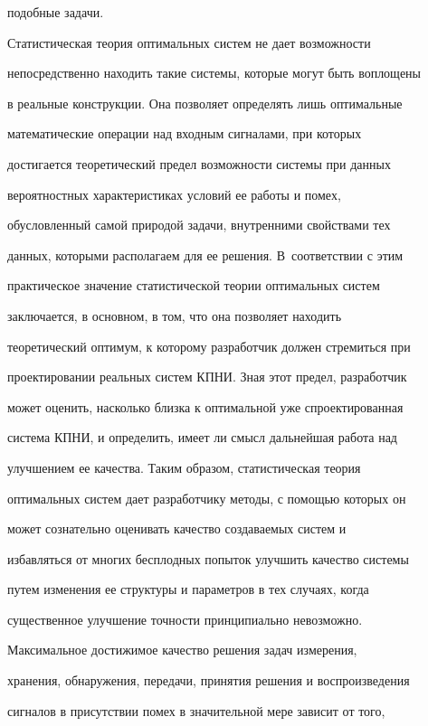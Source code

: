 подобные задачи.





Статистическая теория оптимальных систем не дает возможности


непосредственно находить такие системы, которые могут быть воплощены


в реальные  конструкции. Она позволяет определять лишь оптимальные


математические операции над входным сигналами, при которых


достигается теоретический предел возможности системы при данных


вероятностных характеристиках условий ее работы и помех,


обусловленный самой природой задачи, внутренними свойствами тех


данных, которыми располагаем для ее решения. В~соответствии с этим


практическое значение статистической теории оптимальных систем


заключается, в основном, в том, что она позволяет находить


теоретический оптимум, к которому разработчик должен стремиться при


проектировании  реальных систем \mbox{КПНИ}. Зная этот предел, разработчик


может оценить, насколько близка к оптимальной уже спроектированная


сис\-те\-ма \mbox{КПНИ}, и определить, имеет ли смысл дальнейшая работа над


улучшением ее качества. Таким образом, статистическая теория


оптимальных систем дает разработчику методы, с помощью которых он


может сознательно оценивать качество создаваемых сис\-тем и


избавляться от многих бесплодных попыток улучшить качество системы


путем изменения ее структуры и параметров в тех случаях, когда


существенное улучшение точности принципиально невозможно.





Максимальное достижимое качество решения задач измерения,


хранения, обнаружения, передачи, принятия решения и воспроизведения


сигналов в присутствии помех в значительной мере зависит от того,


